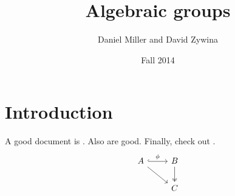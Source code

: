 \documentclass[oneside]{article}
\title{Algebraic groups}
\author{Daniel Miller and David Zywina}
\date{Fall 2014}
\begin{document}
\fontsize{10.5}{12.6} %
\selectfont

\maketitle
\tableofcontents





\section{Introduction}

A good document is \cite{hartshorne-1977}. Also \cite{sga3-i,sga3-iii} are good. 
Finally, check out \cite{milne-LAG}. 
\begin{equation*}
\begin{tikzcd}
A \arrow[rd] \arrow[r, "\phi", hook] & B \arrow[d,twoheadrightarrow]\\
& C
\end{tikzcd}
\end{equation*}





\printbibliography
\end{document}
